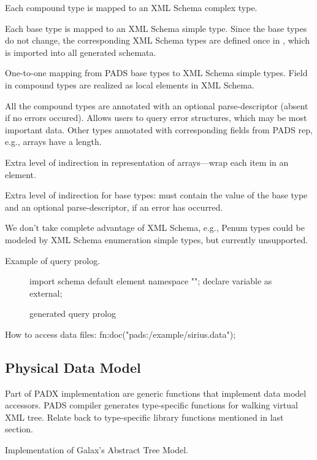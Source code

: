 Each compound type is mapped to an XML Schema complex type.

Each base type is mapped to an XML Schema simple type.  Since the base
types do not change, the corresponding XML Schema types are defined
once in , which is imported into all generated schemata. 

  One-to-one mapping
from PADS base types to XML Schema simple types.  Field in compound
types are realized as local elements in XML Schema. 

All the compound types are annotated with an optional parse-descriptor
(absent if no errors occured).  Allows users to query error
structures, which may be most important data.  Other types annotated
with corresponding fields from PADS rep, e.g., arrays have a length. 

Extra level of indirection in representation of arrays---wrap each
item in an element. 

Extra level of indirection for base types: must contain the value of
the base type and an optional parse-descriptor, if an error has
occurred. 

We don't take complete advantage of XML Schema, e.g., Penum types
could be modeled by XML Schema enumeration simple types, but currently
unsupported.

Example of query prolog. 
\begin{figure*}
\begin{small}
\begin{code}
import schema default element namespace "";
declare variable  as  external; 
\end{code}
\end{small}
\caption{\padx{} generated query prolog}
\label{figure:padx-query-prolog}
\end{figure*}

How to access data files:  fn:doc("pads:/example/sirius.data");

\subsection{Physical Data Model}

Part of PADX implementation are generic functions that implement data
model accessors.  PADS compiler generates type-specific functions for
walking virtual XML tree.  Relate back to type-specific library
functions mentioned in last section.

Implementation of Galax's Abstract Tree Model.

